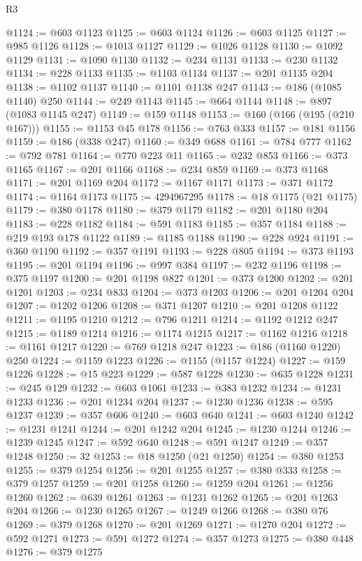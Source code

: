 \begin{lexlean}{R3}
\begin{coremodule}
@1124 := @603 @1123
@1125 := @603 @1124
@1126 := @603 @1125
@1127 := @985 @1126
@1128 := @1013 @1127
@1129 := @1026 @1128
@1130 := @1092 @1129
@1131 := @1090 @1130
@1132 := @234 @1131
@1133 := @230 @1132
@1134 := @228 @1133
@1135 := @1103 @1134
@1137 := @201 @1135 @204
@1138 := @1102 @1137
@1140 := @1101 @1138 @247
@1143 := @186 (@1085 @1140) @250
@1144 := @249 @1143
@1145 := @664 @1144
@1148 := @897 (@1083 @1145 @247)
@1149 := @159 @1148
@1153 := @160 (@166 (@195 (@210 @167)))
@1155 := @1153 @45 @178
@1156 := @763 @333
@1157 := @181 @1156
@1159 := @186 (@338 @247)
@1160 := @349 @688
@1161 := @784 @777
@1162 := @792 @781
@1164 := @770 @223 @11
@1165 := @232 @853
@1166 := @373 @1165
@1167 := @201 @1166
@1168 := @234 @859
@1169 := @373 @1168
@1171 := @201 @1169 @204
@1172 := @1167 @1171
@1173 := @371 @1172
@1174 := @1164 @1173
@1175 := 4294967295
@1178 := @18 @1175 (@21 @1175)
@1179 := @380 @1178
@1180 := @379 @1179
@1182 := @201 @1180 @204
@1183 := @228 @1182
@1184 := @591 @1183
@1185 := @357 @1184
@1188 := @219 @193 @178 @1122
@1189 := @1185 @1188
@1190 := @228 @924
@1191 := @360 @1190
@1192 := @357 @1191
@1193 := @228 @805
@1194 := @373 @1193
@1195 := @201 @1194
@1196 := @997 @384
@1197 := @232 @1196
@1198 := @375 @1197
@1200 := @201 @1198 @827
@1201 := @373 @1200
@1202 := @201 @1201
@1203 := @234 @833
@1204 := @373 @1203
@1206 := @201 @1204 @204
@1207 := @1202 @1206
@1208 := @371 @1207
@1210 := @201 @1208 @1122
@1211 := @1195 @1210
@1212 := @796 @1211
@1214 := @1192 @1212 @247
@1215 := @1189 @1214
@1216 := @1174 @1215
@1217 := @1162 @1216
@1218 := @1161 @1217
@1220 := @769 @1218 @247
@1223 := @186 (@1160 @1220) @250
@1224 := @1159 @1223
@1226 := @1155 (@1157 @1224)
@1227 := @159 @1226
@1228 := @15 @223
@1229 := @587 @1228
@1230 := @635 @1228
@1231 := @245 @129
@1232 := @603 @1061
@1233 := @383 @1232
@1234 := @1231 @1233
@1236 := @201 @1234 @204
@1237 := @1230 @1236
@1238 := @595 @1237
@1239 := @357 @606
@1240 := @603 @640
@1241 := @603 @1240
@1242 := @1231 @1241
@1244 := @201 @1242 @204
@1245 := @1230 @1244
@1246 := @1239 @1245
@1247 := @592 @640
@1248 := @591 @1247
@1249 := @357 @1248
@1250 := 32
@1253 := @18 @1250 (@21 @1250)
@1254 := @380 @1253
@1255 := @379 @1254
@1256 := @201 @1255
@1257 := @380 @333
@1258 := @379 @1257
@1259 := @201 @1258
@1260 := @1259 @204
@1261 := @1256 @1260
@1262 := @639 @1261
@1263 := @1231 @1262
@1265 := @201 @1263 @204
@1266 := @1230 @1265
@1267 := @1249 @1266
@1268 := @380 @76
@1269 := @379 @1268
@1270 := @201 @1269
@1271 := @1270 @204
@1272 := @592 @1271
@1273 := @591 @1272
@1274 := @357 @1273
@1275 := @380 @448
@1276 := @379 @1275

\end{coremodule}
\end{lexlean}
